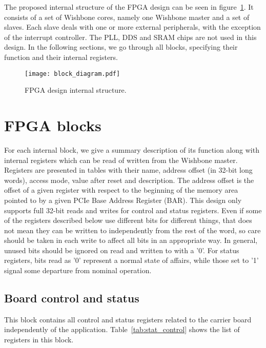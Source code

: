 \documentclass{article}
\begin{document}
The proposed internal structure of the FPGA design can be seen in figure~\ref{fig:block_diagram}. It consists of a set of Wishbone cores, namely one Wishbone master and a set of slaves. Each slave deals with one or more external peripherals, with the exception of the interrupt controller. The PLL, DDS and SRAM chips are not used in this design. In the following sections, we go through all blocks, specifying their function and their internal registers.

\begin{figure}[htbp]
  \centering
  \texttt{[image: block\_diagram.pdf]}
  \caption{FPGA design internal structure.}
  \label{fig:block_diagram}
\end{figure}

\section{FPGA blocks}
For each internal block, we give a summary description of its function along with internal registers which can be read of written from the Wishbone master. Registers are presented in tables with their name, address offset (in 32-bit long words), access mode, value after reset and description. The address offset is the offset of a given register with respect to the beginning of the memory area pointed to by a given PCIe Base Address Register (BAR). This design only supports full 32-bit reads and writes for control and status registers. Even if some of the registers described below use different bits for different things, that does not mean they can be written to independently from the rest of the word, so care should be taken in each write to affect all bits in an appropriate way. In general, unused bits should be ignored on read and written to with a '0'. For status registers, bits read as '0' represent a normal state of affairs, while those set to '1' signal some departure from nominal operation.

\subsection{Board control and status}
This block contains all control and status registers related to the carrier board independently of the application. Table~\ref{tab:stat_control} shows the list of registers in this block.
\end{document}
